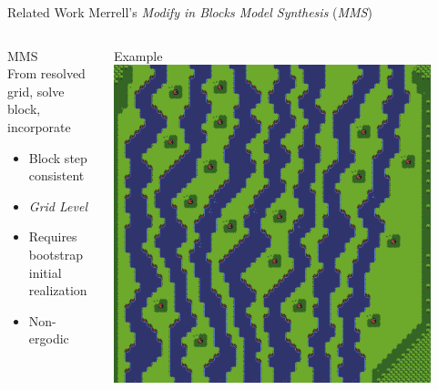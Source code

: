 \documentclass{beamer}
\begin{document}
  \begin{frame}[fragile]{Related Work}
    Merrell's \textit{Modify in Blocks Model Synthesis} (\textit{MMS})
    \begin{columns}[T,onlytextwidth]
        \begin{block}{MMS}
          \hfill \\
          From resolved grid, solve block, incorporate
          \begin{itemize}
            \item Block step consistent
            \item \textit{Grid Level}
            \item Requires bootstrap initial realization
            \item Non-ergodic
          \end{itemize}
        \end{block}
        \begin{block}{Example}
          \includegraphics[width=0.9\textwidth]{img/forestmicro_64x64.pdf}
        \end{block}
    \end{columns}
  \end{frame}
\end{document}
